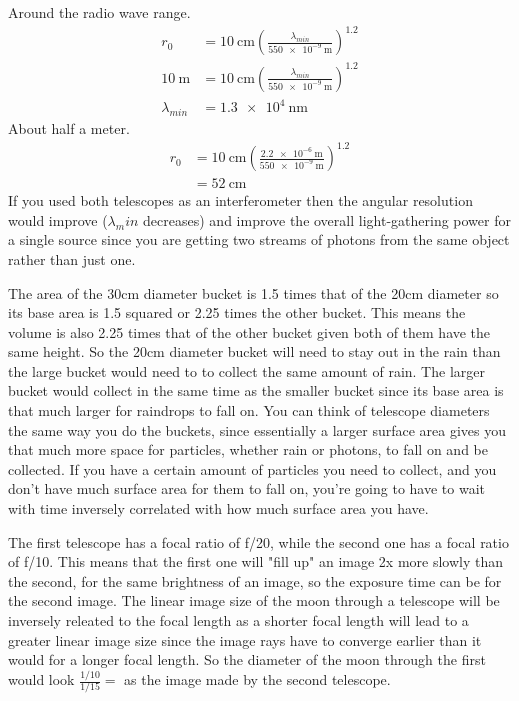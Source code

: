 \documentclass{homework}
\begin{document}
\maketitle


\question
\begin{alphaparts}
	\questionpart Around the radio wave range.
	\begin{align*}
		r_0	&=	\SI{10}{\centi\metre} \left(\frac{\lambda_{min}}{\SI{550e-9}{\metre}}\right)^1.2	\\
		\SI{10}{\metre}	&=	\SI{10}{\centi\metre} \left(\frac{\lambda_{min}}{\SI{550e-9}{\metre}}\right)^1.2	\\
		\lambda_{min}	&=	\boxed{\SI{1.3e4}{\nano\metre}}
	\end{align*}
	\questionpart About half a meter.
	\begin{align*}
		r_0	&=	\SI{10}{\centi\metre} \left(\frac{\SI{2.2e-6}{\metre}}{\SI{550e-9}{\metre}}\right)^1.2	\\
			&=	\boxed{\SI{52}{\centi\metre}}
	\end{align*}
	\questionpart If you used both telescopes as an interferometer then the angular resolution would improve ($\lambda_min$ decreases) and improve the overall light-gathering power for a single source since you are getting two streams of photons from the same object rather than just one.
\end{alphaparts}


\question
The area of the 30cm diameter bucket is 1.5 times that of the 20cm diameter so its base area is 1.5 squared or 2.25 times the other bucket. This means the volume is also 2.25 times that of the other bucket given both of them have the same height. So the 20cm diameter bucket will need to stay out in the rain  than the large bucket would need to to collect the same amount of rain. The larger bucket would collect  in the same time as the smaller bucket since its base area is that much larger for raindrops to fall on. You can think of telescope diameters the same way you do the buckets, since essentially a larger surface area gives you that much more space for particles, whether rain or photons, to fall on and be collected. If you have a certain amount of particles you need to collect, and you don't have much surface area for them to fall on, you're going to have to wait with time inversely correlated with how much surface area you have.


\question
The first telescope has a focal ratio of f/20, while the second one has a focal ratio of f/10. This means that the first one will "fill up" an image 2x more slowly than the second, for the same brightness of an image, so the exposure time can be  for the second image. The linear image size of the moon through a telescope will be inversely releated to the focal length as a shorter focal length will lead to a greater linear image size since the image rays have to converge earlier than it would for a longer focal length. So the diameter of the moon through the first would look $\frac{1/10}{1/15} = $  as the image made by the second telescope.
\end{document}
